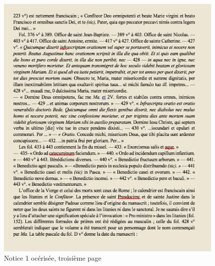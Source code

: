\documentclass[a4paper,12pt,twoside]{book}
\begin{document}
    \begin{figure}[!h]
    \centering
    \includegraphics[width=15cm]{img/Notices_Leroquais/Notice1/OCR/notice_OCR_1_3.png}
    \caption{Notice 1 océrisée, troisième page}
    \end{figure}
    \clearpage
    
\end{document}
